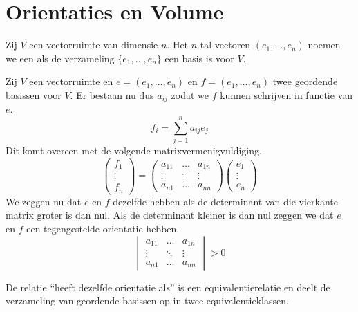 \documentclass[main.tex]{subfiles}
\begin{document}
\chapter{Orientaties en Volume}
\label{cha:orientaties-en-volume}

\begin{de}
  Zij $V$ een vectorruimte van dimensie $n$.
  Het $n$-tal vectoren $(e_{1},\dotsc, e_{n})$ noemen we een  als de verzameling $\{e_{1}, \dotsc, e_{n} \}$ een basis is voor $V$.
\end{de}

\begin{de}
  Zij $V$ een vectorruimte en $e = (e_{1},\dotsc, e_{n})$ en $f = (e_{1},\dotsc, e_{n})$ twee geordende basissen voor $V$.
  Er bestaan nu dus $a_{ij}$ zodat we $f$ kunnen schrijven in functie van $e$.
  \[ f_{i} = \sum_{j=1}^{n}a_{ij}e_{j} \]
  Dit komt overeen met de volgende matrixvermenigvuldiging.
  \[
  \begin{pmatrix}
    f_{1}\\\vdots \\f_{n}
  \end{pmatrix}
    =
  \begin{pmatrix}
    a_{11} & \hdots & a_{1n} \\
    \vdots & \ddots & \vdots \\
    a_{n1} & \hdots & a_{nn}
  \end{pmatrix}
  \begin{pmatrix}
    e_{1}\\\vdots \\e_{n}
  \end{pmatrix}
  \]
  We zeggen nu dat $e$ en $f$ dezelfde  hebben als de determinant van die vierkante matrix groter is dan nul. Als de determinant kleiner is dan nul zeggen we dat $e$ en $f$ een tegengestelde orientatie hebben.
  \[ 
  \begin{vmatrix}
    a_{11} & \hdots & a_{1n} \\
    \vdots & \ddots & \vdots \\
    a_{n1} & \hdots & a_{nn}
  \end{vmatrix}
  > 0
  \]
\end{de}

\begin{ei}
  De relatie ``heeft dezelfde orientatie als'' is een equivalentierelatie en deelt de verzameling van geordende basissen op in twee equivalentieklassen.
\end{ei}
\end{document}
